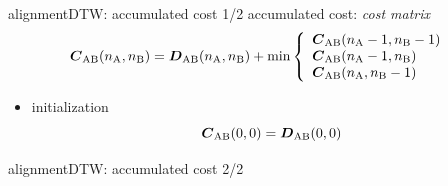         \begin{frame}{alignment}{DTW: accumulated cost 1/2}
            accumulated cost: \textit{cost matrix}
                \begin{equation*}\label{eq:acccost}
                            \mat{C}_{\mathrm{AB}}(n_\mathrm{A},n_\mathrm{B}) = \mat{D}_{\mathrm{AB}}(n_\mathrm{A},n_\mathrm{B}) + \min\left\{
                                                    \begin{array}{llr} 
                                                        \mat{C}_{\mathrm{AB}}(n_\mathrm{A}-1, n_\mathrm{B}-1)\\
                                                        \mat{C}_{\mathrm{AB}}(n_\mathrm{A}-1, n_\mathrm{B}) \\
                                                        \mat{C}_{\mathrm{AB}}(n_\mathrm{A},	n_\mathrm{B}-1)
                                                    \end{array} 
                                                    \right. 
                \end{equation*}
                \begin{itemize}
                    \item	initialization
                        \begin{equation*}
                            \mat{C}_{\mathrm{AB}}(0,0) 	= \mat{D}_{\mathrm{AB}}(0,0) 
                        \end{equation*}
                \end{itemize}
                \begin{figure}
                    
                \end{figure}
        \end{frame}
        \begin{frame}{alignment}{DTW: accumulated cost 2/2}
        \end{frame}
